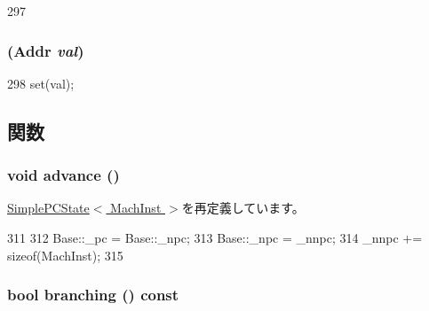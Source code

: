 \begin{DoxyCode}
297 {}
\end{DoxyCode}
\hypertarget{classGenericISA_1_1DelaySlotPCState_acd4d05536ddd4b3edb8afa3ff0708151}{
\subsubsection[{DelaySlotPCState}]{ ({\bf Addr} {\em val})}}
\label{classGenericISA_1_1DelaySlotPCState_acd4d05536ddd4b3edb8afa3ff0708151}



\begin{DoxyCode}
298 { set(val); }
\end{DoxyCode}


\subsection{関数}
\hypertarget{classGenericISA_1_1DelaySlotPCState_a8903a4e9f3d5fb42d0faa9d53e21d85c}{
\subsubsection[{advance}]{\setlength{\rightskip}{0pt plus 5cm}void advance ()}}
\label{classGenericISA_1_1DelaySlotPCState_a8903a4e9f3d5fb42d0faa9d53e21d85c}


\hyperlink{classGenericISA_1_1SimplePCState_a8903a4e9f3d5fb42d0faa9d53e21d85c}{SimplePCState$<$ MachInst $>$}を再定義しています。


\begin{DoxyCode}
311     {
312         Base::_pc = Base::_npc;
313         Base::_npc = _nnpc;
314         _nnpc += sizeof(MachInst);
315     }
\end{DoxyCode}
\hypertarget{classGenericISA_1_1DelaySlotPCState_ae3f0eb15a9382eefff6b00cf7999c2e3}{
\subsubsection[{branching}]{\setlength{\rightskip}{0pt plus 5cm}bool branching () const}}
\label{classGenericISA_1_1DelaySlotPCState_ae3f0eb15a9382eefff6b00cf7999c2e3}


